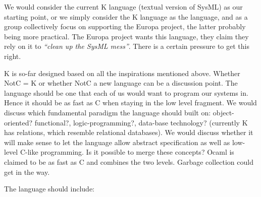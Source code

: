 \documentclass{llncs}
\newcommand{\lang}{NotC}
\begin{document}
We would consider the current K language (textual version of SysML) as our starting 
point, or we simply consider the K language as the language, and as a group collectively
focus on supporting the Europa project, the latter probably being more practical.
The Europa project wants this language, they claim they rely on it to {\em ``clean up the SysML mess''}.
There is a certain pressure to get this right.

K is so-far designed based on all the inspirations mentioned above.
Whether  \lang{} = K or whether \lang{} a new language can be a discussion point. The language 
should be one that each of us would want to program our 
systems in. Hence it should be as fast as C when staying in the low level fragment. 
We would discuss which fundamental paradigm the language should built on: 
object-oriented? functional?, logic-programming?, data-base technology? (currently 
K has relations, which resemble relational databases). We would discuss whether it 
will make sense to let the language allow abstract specification as well as low-level 
C-like programming. Is it possible to merge these concepts? Ocaml is claimed to 
be as fast as C and combines the two levels. Garbage collection could get in the way.

The language should include:
\end{document}

